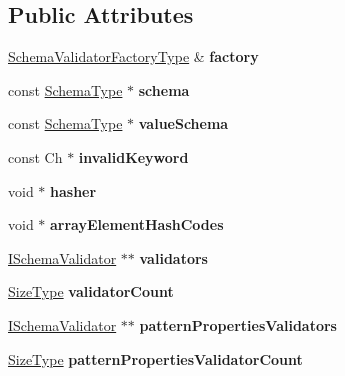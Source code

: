 \subsection*{Public Attributes}
\begin{DoxyCompactItemize}
\item 
\hyperlink{a00182}{Schema\+Validator\+Factory\+Type} \& {\bfseries factory}\hypertarget{a00263_ae2661ad92602b4f12fbffadb3dab502e}{}\label{a00263_ae2661ad92602b4f12fbffadb3dab502e}

\item 
const \hyperlink{a00261}{Schema\+Type} $\ast$ {\bfseries schema}\hypertarget{a00263_af44336e8a612b77a0091cc57f8de1734}{}\label{a00263_af44336e8a612b77a0091cc57f8de1734}

\item 
const \hyperlink{a00261}{Schema\+Type} $\ast$ {\bfseries value\+Schema}\hypertarget{a00263_a34865d65fb3cbb01bc497d0efade0458}{}\label{a00263_a34865d65fb3cbb01bc497d0efade0458}

\item 
const Ch $\ast$ {\bfseries invalid\+Keyword}\hypertarget{a00263_a9f6a91ee46c70e55f287b1e9b219df21}{}\label{a00263_a9f6a91ee46c70e55f287b1e9b219df21}

\item 
void $\ast$ {\bfseries hasher}\hypertarget{a00263_a4b419775e207cf72834f895dc30ac596}{}\label{a00263_a4b419775e207cf72834f895dc30ac596}

\item 
void $\ast$ {\bfseries array\+Element\+Hash\+Codes}\hypertarget{a00263_a5b6ec1a5fde2215de14a65fcbb06edde}{}\label{a00263_a5b6ec1a5fde2215de14a65fcbb06edde}

\item 
\hyperlink{a00183}{I\+Schema\+Validator} $\ast$$\ast$ {\bfseries validators}\hypertarget{a00263_a1d215b80511f602ebece5c83b875cdd9}{}\label{a00263_a1d215b80511f602ebece5c83b875cdd9}

\item 
\hyperlink{a00677_a5ed6e6e67250fadbd041127e6386dcb5}{Size\+Type} {\bfseries validator\+Count}\hypertarget{a00263_a10e5e97640846f3c23eaaba0506bb4f7}{}\label{a00263_a10e5e97640846f3c23eaaba0506bb4f7}

\item 
\hyperlink{a00183}{I\+Schema\+Validator} $\ast$$\ast$ {\bfseries pattern\+Properties\+Validators}\hypertarget{a00263_a758565f674e8fb2066ff0f89ee67a174}{}\label{a00263_a758565f674e8fb2066ff0f89ee67a174}

\item 
\hyperlink{a00677_a5ed6e6e67250fadbd041127e6386dcb5}{Size\+Type} {\bfseries pattern\+Properties\+Validator\+Count}\hypertarget{a00263_a2b8a521d60d39472a1550b535028a353}{}\label{a00263_a2b8a521d60d39472a1550b535028a353}


\end{DoxyCompactItemize}
